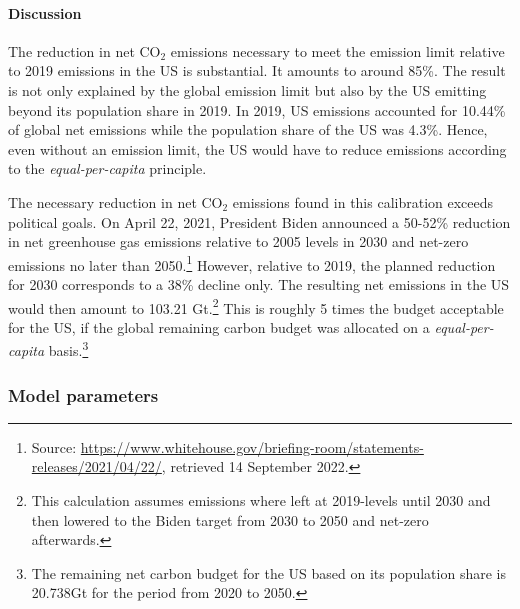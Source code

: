 \paragraph{Discussion}
The reduction in net CO$_2$ emissions necessary to meet the emission limit relative to 2019 emissions in the US  is substantial. It amounts to around 85\%. The result is not only explained by the global emission limit but also by the US emitting beyond its population share in 2019. In 2019, US emissions accounted for 10.44\% of global net emissions while the population share of the US was 4.3\%. Hence, even without an emission limit, the US would have to reduce emissions according to the \textit{equal-per-capita} principle.

The necessary reduction in net CO$_2$ emissions found in this calibration exceeds political goals. On April 22, 2021, President Biden announced a 50-52\% reduction in net greenhouse gas emissions relative to 2005 levels in 2030 %
and net-zero emissions no later than 2050.\footnote{ Source: \href{https://www.whitehouse.gov/briefing-room/statements-releases/2021/04/22/fact-sheet-president-biden-sets-2030-greenhouse-gas-pollution-reduction-target-aimed-at-creating-good-paying-union-jobs-and-securing-u-s-leadership-on-clean-energy-technologies/}{https://www.whitehouse.gov/briefing-room/statements-releases/2021/04/22/}, retrieved 14 September 2022.} 
However, relative to 2019, the planned reduction for 2030 corresponds to a 38\% decline only.
The resulting net emissions in the US would then amount to 103.21 Gt.\footnote{ This calculation assumes emissions where left at 2019-levels until 2030 and then lowered to the Biden target from 2030 to 2050 and net-zero afterwards.} This is roughly 5 times the budget acceptable for the US,  if the global remaining carbon budget was allocated on a \textit{equal-per-capita} basis.\footnote{ The remaining net carbon budget for the US based on its population share is 20.738Gt for the period from 2020 to 2050.} %

\subsubsection{Model parameters}\label{sec:modpar}

